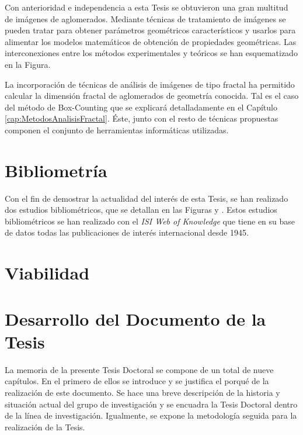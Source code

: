 \par Con anterioridad e independencia a esta Tesis se obtuvieron una gran multitud de imágenes de aglomerados. Mediante técnicas de tratamiento de imágenes se pueden tratar para obtener parámetros geométricos característicos y usarlos para alimentar los modelos matemáticos de obtención de propiedades geométricas. Las interconexiones entre los métodos experimentales y teóricos se han esquematizado en la Figura.

\par La incorporación de técnicas de análisis de imágenes de tipo fractal ha permitido calcular la dimensión fractal de aglomerados de geometría conocida. Tal es el caso del método de Box-Counting que se explicará detalladamente en el Capítulo \ref{cap:MetodosAnalisisFractal}. Éste, junto con el resto de técnicas propuestas componen el conjunto de herramientas informáticas utilizadas.

\section{Bibliometría}\label{sec:Bibliometria}

\par Con el fin de demostrar la actualidad del interés de esta Tesis, se han realizado dos estudios bibliométricos, que se detallan en las Figuras y . Estos estudios bibliométricos se han realizado con el \emph{ISI Web of Knowledge} que tiene en su base de datos todas las publicaciones de interés internacional desde 1945.

\section{Viabilidad}\label{sec:Viabilidad}

\section{Desarrollo del Documento de la Tesis}\label{sec:DesarrolloDocumento}

\par La memoria de la presente Tesis Doctoral se compone de un total de nueve capítulos. En el primero de ellos se introduce y se justifica el porqué de la realización de este documento. Se hace una breve descripción de la historia y situación actual del grupo de investigación y se encuadra la Tesis Doctoral dentro de la línea de investigación. Igualmente, se expone la metodología seguida para la realización de la Tesis.

